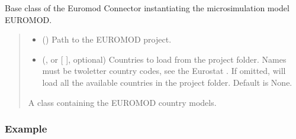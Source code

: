 \documentclass[letterpaper,10pt,english]{sphinxmanual}
\begin{document}
\begin{fulllineitems}
\label{\detokenize{autoapi/euromod/core/index:euromod.core.Model}}
\pysigstartsignatures
{}
\pysigstopsignatures
\sphinxAtStartPar
Base class of the Euromod Connector instantiating the microsimulation model
EUROMOD.
\begin{quote}\begin{description}
\begin{itemize}
\item {} 
\sphinxAtStartPar
{} () \textendash{} Path to the EUROMOD project.

\item {} 
\sphinxAtStartPar
{} (, or  {[}  {]}, optional) \textendash{} Countries to load from the project folder. Names must be two\sphinxhyphen{}letter
country codes, see the Eurostat .
If omitted, will load all the available countries in the project folder.
Default is None.

\end{itemize}

\sphinxAtStartPar
A class containing the EUROMOD country models.

\sphinxAtStartPar
{\hyperref[\detokenize{autoapi/euromod/core/index:euromod.core.Model}]{}}

\end{description}\end{quote}
\subsubsection*{Example}


\end{fulllineitems}
\end{document}
